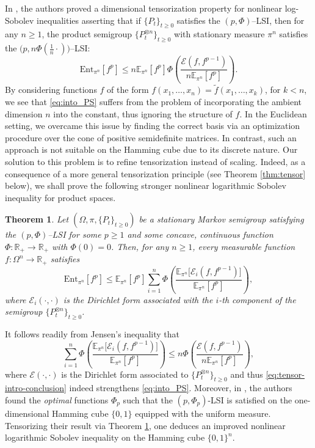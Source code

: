 \documentclass[a4paper,twoside,11pt,reqno]{amsart}
\newtheorem{theorem}{Theorem}
\newcommand{\R}{\mathbb{R}} %
\newcommand{\mb}{\mathbb}
\newcommand{\ms}{\mathscr}
\begin{document}
In \cite[Theorem~1]{PS19}, the authors proved a dimensional tensorization property for nonlinear log-Sobolev inequalities asserting that if $\{P_t\}_{t\geq0}$ satisfies the $(p,\Phi)$--LSI, then for any $n\geq1$, the product semigroup $\{P_t^{\otimes n}\}_{t\geq0}$ with stationary measure $\pi^n$ satisfies the $\big(p, n\Phi(\tfrac{1}{n}\cdot )\big)$--LSI:
\begin{equation} \label{eq:into_PS}
\mathrm{Ent}_{\pi^n}[f^p] \leq  n\mb{E}_{\pi^n}[f^p]\Phi\left( \frac{\ms{E}(f,f^{p-1})}{n\mb{E}_{\pi^n}[f^p]}\right).
\end{equation}
By considering functions $f$ of the form $f(x_1,\ldots,x_n)= \tilde f(x_1,\ldots, x_k)$, for $k<n$, we see that \eqref{eq:into_PS} suffers from the problem of incorporating the ambient dimension $n$ into the constant, thus ignoring the structure of $f$. In the Euclidean setting, we overcame this issue by finding the correct basis via an optimization procedure over the cone of positive semidefinite matrices. In contrast, such an approach is not suitable on the Hamming cube due to its discrete nature. Our solution to this problem is to refine tensorization instead of scaling. Indeed, as a consequence of a more general tensorization principle (see Theorem \ref{thm:tensor} below), we shall prove the following stronger nonlinear logarithmic Sobolev inequality for product spaces.

\begin{theorem} \label{thm:tensor-intro}
Let $(\Omega,\pi,\{P_t\}_{t\geq0})$ be a stationary Markov semigroup satisfying the $(p,\Phi)$--LSI for some $p\geq1$ and some concave, continuous function $\Phi:\R_+\to\R_+$ with $\Phi(0)=0$. Then, for any $n\geq1$, every measurable function $f:\Omega^n\to\R_+$ satisfies
\begin{equation} \label{eq:tensor-intro-conclusion}
\mathrm{Ent}_{\pi^n}[f^p] \leq \mb{E}_{\pi^n}[f^p] \sum_{i=1}^n \Phi\left( \frac{\mb{E}_{\pi^n}\big[\ms{E}_i(f,f^{p-1})\big]}{\mb{E}_{\pi^n}[f^p]}\right),
\end{equation}
where $\ms{E}_i(\cdot,\cdot)$ is the Dirichlet form associated with the $i$-th component of the semigroup $\{P_t^{\otimes n}\}_{t\geq0}$.
\end{theorem}

It follows readily from Jensen's inequality that
\begin{equation}
 \sum_{i=1}^n \Phi\left( \frac{\mb{E}_{\pi^n}\big[\ms{E}_i(f,f^{p-1})\big]}{\mb{E}_{\pi^n}[f^p]}\right) \leq  n\Phi\left( \frac{\ms{E}(f,f^{p-1})}{n\mb{E}_{\pi^n}[f^p]}\right),
\end{equation}
where $\ms{E}(\cdot,\cdot)$ is the Dirichlet form associated to $\{P_t^{\otimes n}\}_{t\geq0}$ and thus \eqref{eq:tensor-intro-conclusion} indeed strengthens \eqref{eq:into_PS}. Moreover, in \cite[Theorems~4 and 6]{PS19}, the authors found the \emph{optimal} functions $\Phi_p$ such that the $(p,\Phi_p)$-LSI is satisfied on the one-dimensional Hamming cube $\{0,1\}$ equipped with the uniform measure. Tensorizing their result via Theorem \ref{thm:tensor-intro}, one deduces an improved nonlinear logarithmic Sobolev inequality on the Hamming cube $\{0,1\}^n$.  
\end{document}
